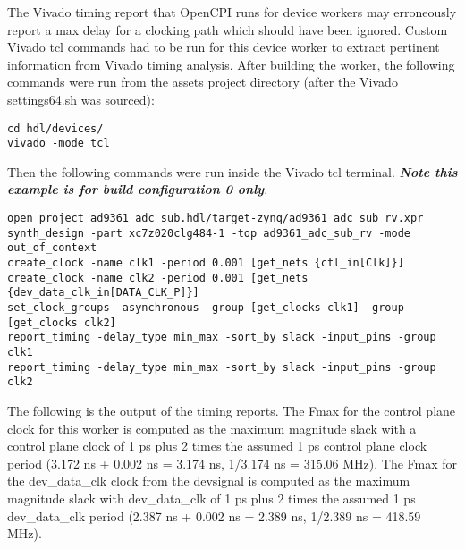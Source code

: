 \documentclass{article}
\begin{document}
The Vivado timing report that OpenCPI runs for device workers may erroneously report a max delay for a clocking path which should have been ignored. Custom Vivado tcl commands had to be run for this device worker to extract pertinent information from Vivado timing analysis. After building the worker, the following commands were run from the assets project directory (after the Vivado settings64.sh was sourced):
\begin{lstlisting}
cd hdl/devices/
vivado -mode tcl
\end{lstlisting}
Then the following commands were run inside the Vivado tcl terminal. \textbf{\textit{Note this example is for build configuration 0 only}}.
\begin{lstlisting}
open_project ad9361_adc_sub.hdl/target-zynq/ad9361_adc_sub_rv.xpr
synth_design -part xc7z020clg484-1 -top ad9361_adc_sub_rv -mode out_of_context
create_clock -name clk1 -period 0.001 [get_nets {ctl_in[Clk]}]
create_clock -name clk2 -period 0.001 [get_nets {dev_data_clk_in[DATA_CLK_P]}]
set_clock_groups -asynchronous -group [get_clocks clk1] -group [get_clocks clk2]
report_timing -delay_type min_max -sort_by slack -input_pins -group clk1
report_timing -delay_type min_max -sort_by slack -input_pins -group clk2
\end{lstlisting}
The following is the output of the timing reports. The Fmax for the control plane clock for this worker is computed as the maximum magnitude slack with a control plane clock of 1 ps plus 2 times the assumed 1 ps control plane clock period (3.172 ns + 0.002 ns = 3.174 ns, 1/3.174 ns = 315.06 MHz). The Fmax for the dev\_data\_clk clock from the devsignal is computed as the maximum magnitude slack with dev\_data\_clk of 1 ps plus 2 times the assumed 1 ps dev\_data\_clk period (2.387 ns + 0.002 ns = 2.389 ns, 1/2.389 ns = 418.59 MHz).
\fontsize{6}{12}\selectfont
\end{document}
